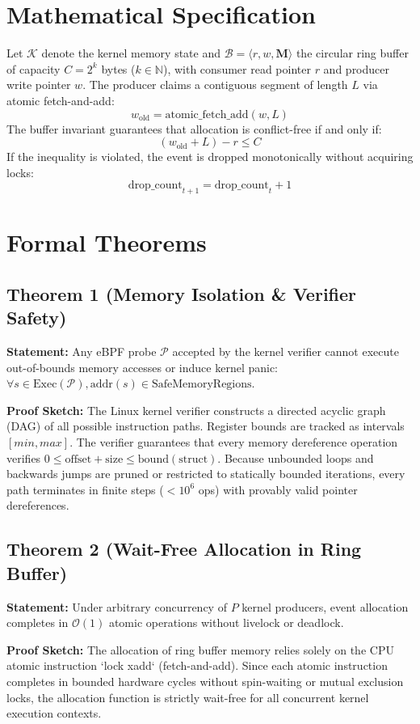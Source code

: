 \documentclass[10pt,journal,compsoc]{IEEEtran}
\begin{document}
\section{Mathematical Specification}
Let $\mathcal{K}$ denote the kernel memory state and $\mathcal{B} = \langle r, w, \mathbf{M} \rangle$ the circular ring buffer of capacity $C = 2^k$ bytes ($k \in \mathbb{N}$), with consumer read pointer $r$ and producer write pointer $w$.
The producer claims a contiguous segment of length $L$ via atomic fetch-and-add:
$$w_{\text{old}} = \text{atomic\_fetch\_add}(w, L)$$
The buffer invariant guarantees that allocation is conflict-free if and only if:
$$(w_{\text{old}} + L) - r \le C$$
If the inequality is violated, the event is dropped monotonically without acquiring locks:
$$\text{drop\_count}_{t+1} = \text{drop\_count}_t + 1$$

\section{Formal Theorems}
\subsection{Theorem 1 (Memory Isolation & Verifier Safety)}
\textbf{Statement:} Any eBPF probe $\mathcal{P}$ accepted by the kernel verifier cannot execute out-of-bounds memory accesses or induce kernel panic: $\forall s \in \text{Exec}(\mathcal{P}), \text{addr}(s) \in \text{SafeMemoryRegions}$.

\textbf{Proof Sketch:} The Linux kernel verifier constructs a directed acyclic graph (DAG) of all possible instruction paths. Register bounds are tracked as intervals $[min, max]$. The verifier guarantees that every memory dereference operation verifies $0 \le \text{offset} + \text{size} \le \text{bound}(\text{struct})$. Because unbounded loops and backwards jumps are pruned or restricted to statically bounded iterations, every path terminates in finite steps ($< 10^6$ ops) with provably valid pointer dereferences.

\subsection{Theorem 2 (Wait-Free Allocation in Ring Buffer)}
\textbf{Statement:} Under arbitrary concurrency of $P$ kernel producers, event allocation completes in $\mathcal{O}(1)$ atomic operations without livelock or deadlock.

\textbf{Proof Sketch:} The allocation of ring buffer memory relies solely on the CPU atomic instruction `lock xadd` (fetch-and-add). Since each atomic instruction completes in bounded hardware cycles without spin-waiting or mutual exclusion locks, the allocation function is strictly wait-free for all concurrent kernel execution contexts.
\end{document}
